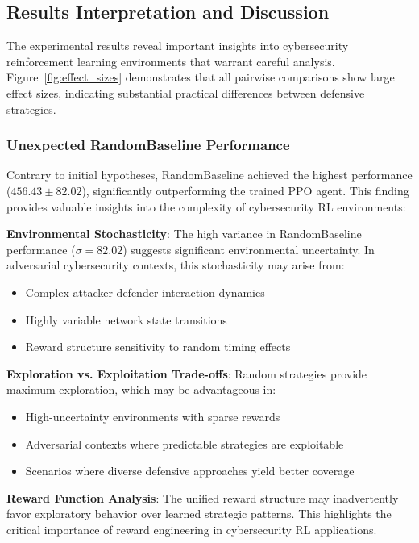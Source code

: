 \documentclass[12pt,oneside]{article}
\begin{document}
\subsection{Results Interpretation and Discussion}

The experimental results reveal important insights into cybersecurity reinforcement learning environments that warrant careful analysis. Figure~\ref{fig:effect_sizes} demonstrates that all pairwise comparisons show large effect sizes, indicating substantial practical differences between defensive strategies.

\subsubsection{Unexpected RandomBaseline Performance}

Contrary to initial hypotheses, RandomBaseline achieved the highest performance ($456.43 \pm 82.02$), significantly outperforming the trained PPO agent. This finding provides valuable insights into the complexity of cybersecurity RL environments:

\textbf{Environmental Stochasticity}: The high variance in RandomBaseline performance ($\sigma = 82.02$) suggests significant environmental uncertainty. In adversarial cybersecurity contexts, this stochasticity may arise from:
\begin{itemize}
    \item Complex attacker-defender interaction dynamics
    \item Highly variable network state transitions
    \item Reward structure sensitivity to random timing effects
\end{itemize}

\textbf{Exploration vs. Exploitation Trade-offs}: Random strategies provide maximum exploration, which may be advantageous in:
\begin{itemize}
    \item High-uncertainty environments with sparse rewards
    \item Adversarial contexts where predictable strategies are exploitable
    \item Scenarios where diverse defensive approaches yield better coverage
\end{itemize}

\textbf{Reward Function Analysis}: The unified reward structure may inadvertently favor exploratory behavior over learned strategic patterns. This highlights the critical importance of reward engineering in cybersecurity RL applications.
\end{document}
